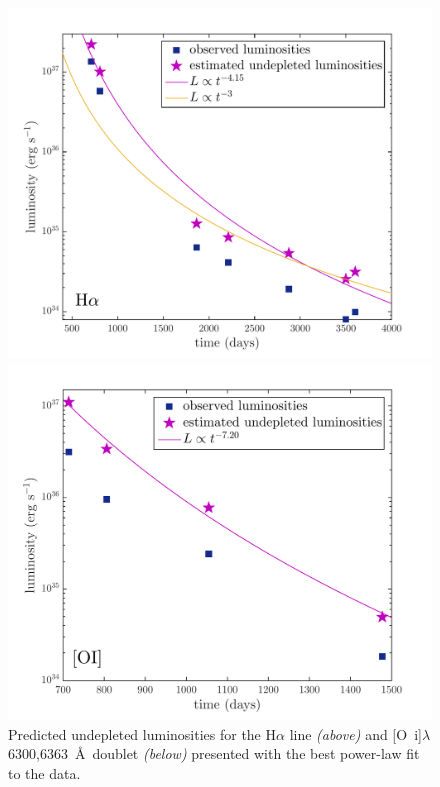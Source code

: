 \begin{figure}
\centering
\includegraphics[clip=true,scale=0.6]{chapters/chapter5/images/undep_fluxes_Ha.pdf}

\includegraphics[clip=true,scale=0.6]{chapters/chapter5/images/undep_lum_OI.pdf}
\caption{Predicted undepleted luminosities for the H$\alpha$ line 
\textit{(above)} and [O~{\sc i}]$\lambda$6300,6363~\AA\ doublet 
\textit{(below)} presented with the best power-law fit to the data.}
\label{undep}
\end{figure}




